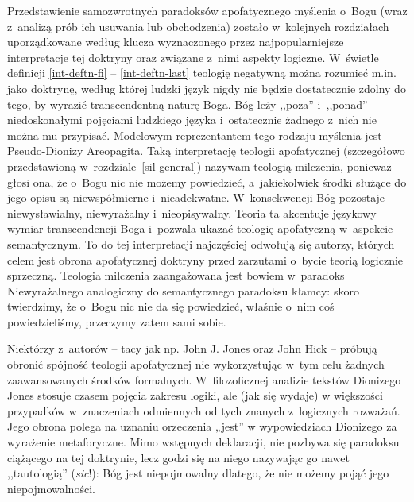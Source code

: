 Przedstawienie samozwrotnych paradoksów apofatycznego myślenia o~Bo\-gu (wraz z~analizą prób ich usuwania lub obchodzenia) zostało w~kolejnych rozdziałach uporządkowane według klucza wyznaczonego przez najpopularniejsze interpretacje tej doktryny oraz związane z~nimi aspekty logiczne. W~świetle definicji \ref{int-deftn-fi} -- \ref{int-deftn-last} teologię negatywną można rozumieć m.in. jako doktrynę, według której ludzki język nigdy nie będzie dostatecznie zdolny do tego, by wyrazić transcendentną naturę Boga. Bóg leży ,,poza'' i~,,ponad'' niedoskonałymi pojęciami ludzkiego języka i~ostatecznie żadnego z~nich nie można mu przypisać. Modelowym reprezentantem tego rodzaju myślenia jest Pseudo-Dionizy Areopagita. Taką interpretację teologii apofatycznej (szczegółowo przedstawioną w~rozdziale~\ref{sil-general}) nazywam teologią milczenia, ponieważ głosi ona, że o~Bogu nic nie możemy powiedzieć, a~jakiekolwiek środki służące do jego opisu są niewspółmierne i~nieadekwatne. W~konsekwencji Bóg pozostaje niewysławialny, niewyrażalny i~nieopisywalny. Teoria ta akcentuje językowy wymiar transcendencji Boga i~pozwala ukazać teologię apofatyczną w~aspekcie semantycznym. To do tej interpretacji najczęściej odwołują się autorzy, których celem jest obrona apofatycznej doktryny przed zarzutami o~bycie teorią logicznie sprzeczną. Teologia milczenia zaangażowana jest bowiem w~paradoks Niewyrażalnego analogiczny do semantycznego paradoksu kłamcy: skoro twierdzimy, że o~Bogu nic nie da się powiedzieć, właśnie o~nim coś powiedzieliśmy, przeczymy zatem sami sobie.

Niektórzy z~autorów -- tacy jak np. John J. Jones oraz John Hick -- próbują obronić spójność teologii apofatycznej nie wykorzystując w~tym celu żadnych zaawansowanych środków formalnych.
W~filozoficznej analizie tekstów Dionizego Jones stosuje czasem pojęcia zakresu logiki, ale (jak się wydaje) w większości przypadków w~znaczeniach odmiennych od tych znanych z~logicznych rozważań. Jego obrona polega na uznaniu orzeczenia „jest” w wypowiedziach Dionizego za wyrażenie metaforyczne. Mimo wstępnych deklaracji, nie pozbywa się paradoksu ciążącego na tej doktrynie, lecz godzi się na niego nazywając go nawet ,,tautologią'' (\textit{sic}!): Bóg jest niepojmowalny dlatego, że nie możemy pojąć jego niepojmowalności.

